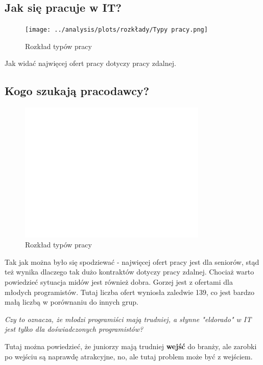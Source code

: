 \documentclass{article}
\begin{document}
\subsection{Jak się pracuje w IT?}

\begin{figure}[H]
    \centering
    \texttt{[image: ../analysis/plots/rozkłady/Typy pracy.png]}
    \caption{Rozkład typów pracy}
\end{figure}

\quad Jak widać najwięcej ofert pracy dotyczy pracy zdalnej.


\subsection{Kogo szukają pracodawcy?}

\begin{figure}[H]
    \centering
    \includegraphics[width=0.8\textwidth]{../analysis/plots/rozkłady/Rozkład doświadczenia.png}
    \caption{Rozkład typów pracy}
\end{figure}

\quad Tak jak można było się spodziewać - najwięcej ofert pracy jest dla seniorów,
stąd też wynika dlaczego tak dużo kontraktów dotyczy pracy zdalnej. Chociaż
warto powiedzieć sytuacja midów jest również dobra. Gorzej jest z ofertami dla młodych programistów.
Tutaj liczba ofert wyniosła zaledwie 139, co jest bardzo małą liczbą w porównaniu do innych grup.

\textit{Czy to oznacza, że młodzi programiści mają trudniej, a słynne "eldorado" w IT jest tylko dla doświadczonych programistów?}

\quad Tutaj można powiedzieć, że juniorzy mają trudniej \textbf{wejść} do branży, ale zarobki po wejściu są naprawdę atrakcyjne,
no, ale tutaj problem może być z wejściem.
\end{document}
